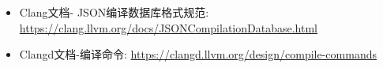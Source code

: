
\begin{itemize}
\item
Clang文档- JSON编译数据库格式规范: \url{https://clang.llvm.org/docs/JSONCompilationDatabase.html}

\item
Clangd文档-编译命令: \url{https://clangd.llvm.org/design/compile-commands}
\end{itemize}